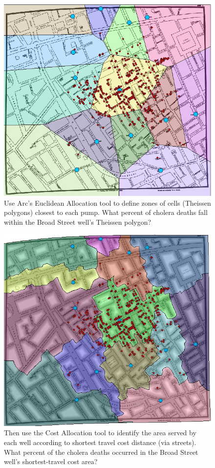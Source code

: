 \documentclass[12pt]{article}
\begin{document}
\begin{figure}
\centering
\includegraphics[scale=1.0]{gis_1}
\caption{ Use Arc's Euclidean Allocation tool to define zones of cells (Theissen polygons) closest to each pump.  What percent of cholera deaths fall within the Broad Street well's Theissen polygon? \cite{udel2}}
\label{fig:gis1}
\end{figure}

\begin{figure}
\centering
\includegraphics[scale=1.0]{gis_2}
\caption{Then use the Cost Allocation tool to identify the area served by each well according to shortest travel cost distance (via streets).  What percent of the cholera deaths occurred in the Broad Street well's shortest-travel cost area?  \cite{udel2}}
\label{fig:gis2}
\end{figure}
\end{document}
